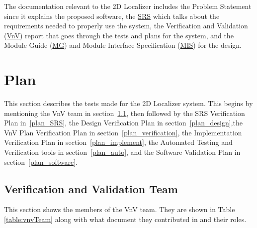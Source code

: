 \documentclass[12pt, titlepage]{article}
\begin{document}


The documentation relevant to the 2D Localizer includes the Problem Statement since it explains the proposed software, the \href{https://github.com/AliyahJimoh/2D-Localizer/blob/main/docs/SRS/SRS.pdf}{SRS} which talks about the requirements needed to properly use the system, the Verification and Validation (\href{https://github.com/AliyahJimoh/2D-Localizer/blob/main/docs/VnVReport/VnVReport.pdf}{VnV}) report that goes through the tests and plans for the system, and the Module Guide (\href{https://github.com/AliyahJimoh/2D-Localizer/blob/main/docs/Design/SoftArchitecture/MG.pdf}{MG}) and Module Interface Specification (\href{https://github.com/AliyahJimoh/2D-Localizer/blob/main/docs/Design/SoftDetailedDes/MIS.pdf}{MIS}) for the design.

\section{Plan}\label{sec_plan}

This section describes the tests made for the 2D Localizer system. This begins by mentioning the VnV team in section~\ref{vnv_team}, then followed by the SRS Verification Plan in~\ref{plan_SRS}, the Design Verification Plan in section~\ref{plan_design},the VnV Plan Verification Plan in section~\ref{plan_verification}, the Implementation Verification Plan in section~\ref{plan_implement}, the Automated Testing and Verification tools in section~\ref{plan_auto}, and the Software Validation Plan in section~\ref{plan_software}.

\subsection{Verification and Validation Team}\label{vnv_team}

This section shows the members of the VnV team. They are shown in Table \ref{table:vnvTeam} along with what document they contributed in and their roles.
\end{document}
